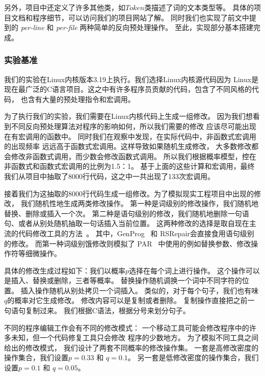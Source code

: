 另外，项目中还定义了许多其他类，如$Token$类描述了词的文本类型等。
具体的项目文档和程序细节，可以访问我们的项目网站了解。
同时我们也实现了前文中提到的 \emph{per-line} 和 \emph{per-file}
两种简单的反向预处理操作。
至此，实现部分基本搭建完成。


\subsubsection{实验基准}
我们的实验在Linux内核版本3.19上执行。我们选择Linux内核源代码因为
Linux是现在最广泛的C语言项目。这之中有许多程序员贡献的代码，包含了不同风格的代码，
也含有大量的预处理指令和宏调用。

为了执行我们的实验，我们需要在Linux内核代码上生成一组修改。
因为我们想看到不同反向预处理算法对程序的影响如何，所以我们需要的修改
应该尽可能出现在有宏调用的函数中。
同时我们在观察中发现，在实际代码中，非函数式宏调用的出现频率
远远高于函数式宏调用。这样导致如果随机生成修改，
大多数修改都会修改非函数式调用，而少数会修改函数式调用。
所以我们根据概率模型，控在非函数式和函数式宏调用的比例为1.5：1。
基于上面的这些计算和宏调用，最终我们从项目中抽取了8000行代码，这之中一共出现了133次宏调用。

接着我们为这抽取的8000行代码生成一组修改。为了模拟现实工程项目中出现的修改，
我们随机性地生成两类修改操作。
第一种是词级别的修改操作，我们随机地替换、删除或插入一个次。
第二种是语句级别的修改，我们随机地删除一句语句、或者从别处随机抽取一句话插入当前位置。
这两种修改的选择是取自现在主流的代码修改工具的方法~\parencite{le2012genprog,QiMLDW14,kim2013automatic}。
其中，GenProg~\parencite{le2012genprog} 和
RSRepair\parencite{QiMLDW14}会直接食用语句级别的修改。
而第一种词级别饿修改则模拟了 PAR~\parencite{kim2013automatic}
中使用的例如替换参数、修改操作符等细微操作。

具体的修改生成过程如下：我们以概率$p$选择在每个词上进行操作。
这个操作可以是插入、替换或删除，三者等概率。
替换操作随机调换一个词中不同字符的位置。
插入操作随机从别处拷贝一个词插入。
类似的，对于每个句子，我们也有味$q$的概率对它生成修改。
修改内容可以是复制或者删除。
复制操作直接把之前一句语句复制过来。
我们根据C语法，根据分号来划分句子。

不同的程序编辑工作会有不同的修改模式：
一个移动工具可能会修改程序中的许多未知，但一个代码修复工具只会修改
程序的少数地方。
为了模拟不同工具之间给出的修改模式，
我们设计了两套不同概率的修改操作集。
一套是高修改密度的操作集合，我们设置$p=0.33$ 和 $q=0.1$。
另一套是低修改密度的操作集合，我们设置$p=0.1$ 和 $q=0.05$。

